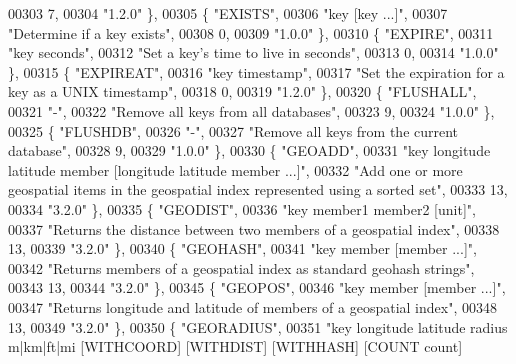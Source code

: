 \begin{DoxyCode}
00303     7,
00304     \textcolor{stringliteral}{"1.2.0"} \},
00305     \{ \textcolor{stringliteral}{"EXISTS"},
00306     \textcolor{stringliteral}{"key [key ...]"},
00307     \textcolor{stringliteral}{"Determine if a key exists"},
00308     0,
00309     \textcolor{stringliteral}{"1.0.0"} \},
00310     \{ \textcolor{stringliteral}{"EXPIRE"},
00311     \textcolor{stringliteral}{"key seconds"},
00312     \textcolor{stringliteral}{"Set a key's time to live in seconds"},
00313     0,
00314     \textcolor{stringliteral}{"1.0.0"} \},
00315     \{ \textcolor{stringliteral}{"EXPIREAT"},
00316     \textcolor{stringliteral}{"key timestamp"},
00317     \textcolor{stringliteral}{"Set the expiration for a key as a UNIX timestamp"},
00318     0,
00319     \textcolor{stringliteral}{"1.2.0"} \},
00320     \{ \textcolor{stringliteral}{"FLUSHALL"},
00321     \textcolor{stringliteral}{"-"},
00322     \textcolor{stringliteral}{"Remove all keys from all databases"},
00323     9,
00324     \textcolor{stringliteral}{"1.0.0"} \},
00325     \{ \textcolor{stringliteral}{"FLUSHDB"},
00326     \textcolor{stringliteral}{"-"},
00327     \textcolor{stringliteral}{"Remove all keys from the current database"},
00328     9,
00329     \textcolor{stringliteral}{"1.0.0"} \},
00330     \{ \textcolor{stringliteral}{"GEOADD"},
00331     \textcolor{stringliteral}{"key longitude latitude member [longitude latitude member ...]"},
00332     \textcolor{stringliteral}{"Add one or more geospatial items in the geospatial index represented using a sorted set"},
00333     13,
00334     \textcolor{stringliteral}{"3.2.0"} \},
00335     \{ \textcolor{stringliteral}{"GEODIST"},
00336     \textcolor{stringliteral}{"key member1 member2 [unit]"},
00337     \textcolor{stringliteral}{"Returns the distance between two members of a geospatial index"},
00338     13,
00339     \textcolor{stringliteral}{"3.2.0"} \},
00340     \{ \textcolor{stringliteral}{"GEOHASH"},
00341     \textcolor{stringliteral}{"key member [member ...]"},
00342     \textcolor{stringliteral}{"Returns members of a geospatial index as standard geohash strings"},
00343     13,
00344     \textcolor{stringliteral}{"3.2.0"} \},
00345     \{ \textcolor{stringliteral}{"GEOPOS"},
00346     \textcolor{stringliteral}{"key member [member ...]"},
00347     \textcolor{stringliteral}{"Returns longitude and latitude of members of a geospatial index"},
00348     13,
00349     \textcolor{stringliteral}{"3.2.0"} \},
00350     \{ \textcolor{stringliteral}{"GEORADIUS"},
00351     \textcolor{stringliteral}{"key longitude latitude radius m|km|ft|mi [WITHCOORD] [WITHDIST] [WITHHASH] [COUNT count]
}
\end{DoxyCode}
